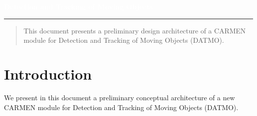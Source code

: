 \documentclass[letterpaper]{article}
\author{%
    Stiven S. Dias \\
    Instituto Tecnol\'ogico de Aeron\'autica\\
    \texttt{stivendias@gmail.com}\vspace{40pt}
}
\makeatletter
\def\printauthor{%
    {\large \@author}}
\makeatother
\begin{document}
\begin{titlepage}
\BgThispage
{}
\vspace*{0.3\textheight}
\noindent
\textcolor{white}{\Huge\textbf{\textsf{Detection and Tracking of Moving Objects}}}
\vspace*{2cm}\par
\noindent
\begin{minipage}{0.35\linewidth}
    \begin{flushright}
        \printauthor
    \end{flushright}
\end{minipage} \hspace{15pt}
%
\begin{minipage}{0.02\linewidth}
    \rule{1pt}{175pt}
\end{minipage} \hspace{-10pt}
%
\begin{minipage}{0.63\linewidth}
\vspace{5pt}


\begin{abstract} 
This document presents a preliminary design architecture of a CARMEN module for Detection and Tracking of Moving Objects (DATMO).
\end{abstract}
\end{minipage}
\end{titlepage}
\restoregeometry
\newpage

\section{Introduction}
\label{sec:intro}

We present in this document a preliminary conceptual architecture of a new CARMEN module for Detection and Tracking of Moving Objects (DATMO).
\end{document}
